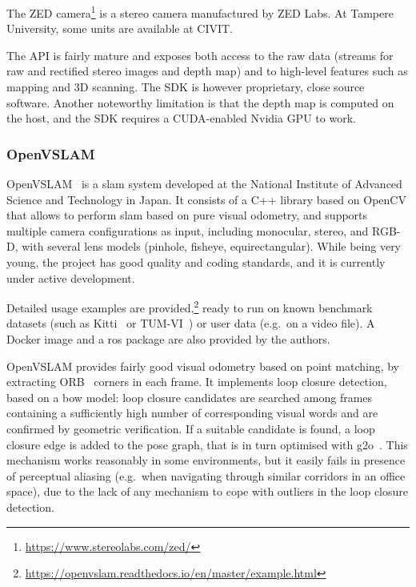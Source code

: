 \documentclass[11pt, letterpaper, twoside]{article}
\begin{document}
The ZED camera\footnote{\url{https://www.stereolabs.com/zed/}} is a stereo
camera manufactured by ZED Labs. At Tampere University, some units are
available at CIVIT.

The API is fairly mature and exposes both access to the raw data (streams for
raw and rectified stereo images and depth map) and to high-level features such
as mapping and 3D scanning. The SDK is however proprietary, close source
software. Another noteworthy limitation is that the depth map is computed on
the host, and the SDK requires a CUDA-enabled Nvidia GPU to work.

\subsubsection{OpenVSLAM}

OpenVSLAM~\cite{openvslam2019} is a \gls{slam} system developed at the National
Institute of Advanced Science and Technology in Japan. It consists of a C++
library based on OpenCV that allows to perform \gls{slam} based on pure visual
odometry, and supports multiple camera configurations as input, including
monocular, stereo, and RGB-D, with several lens models (pinhole, fisheye,
equirectangular). While being very young, the project has good quality and
coding standards, and it is currently under active development.

Detailed usage examples are
provided,\footnote{\url{https://openvslam.readthedocs.io/en/master/example.html}}
ready to run on known benchmark datasets (such as Kitti~\cite{geiger2013vision}
or TUM-VI~\cite{schubert2018vidataset}) or user data (e.g.\ on a video file). A
Docker image and a \gls{ros} package are also provided by the authors.

OpenVSLAM provides fairly good visual odometry based on point matching, by
extracting ORB~\cite{rublee2011orb} corners in each frame. It implements loop
closure detection, based on a \gls{bow} model: loop closure candidates are
searched among frames containing a sufficiently high number of corresponding
visual words and are confirmed by geometric verification. If a suitable
candidate is found, a loop closure edge is added to the pose graph, that is in
turn optimised with g2o~\cite{grisetti2011g2o}. This mechanism works reasonably
in some environments, but it easily fails in presence of perceptual aliasing
(e.g.\ when navigating through similar corridors in an office space), due to
the lack of any mechanism to cope with outliers in the loop closure detection.
\end{document}
